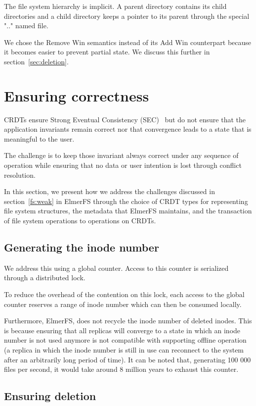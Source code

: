 \documentclass[sigconf, anonymous, 10pt]{acmart}
\begin{document}
The file system hierarchy is implicit. A parent directory contains its child
directories and a child directory keeps a pointer to its parent through
the special ".." named file.

We chose the Remove Win semantics instead of its Add Win counterpart because
it becomes easier to prevent partial state. We discuss this further
in section~\ref{sec:deletion}.

\section{Ensuring correctness}

CRDTs ensure Strong Eventual Consistency (SEC)~\cite{shapiro2011conflict} but
do not ensure that the application invariants remain correct
nor that convergence leads to a state that is meaningful
to the user.

The challenge is to keep those invariant always correct under any sequence
of operation while ensuring that no data or user intention is lost through
conflict resolution.

In this section,
we present how we address the challenges discussed in section~\ref{fs:weak}
in ElmerFS through the choice of CRDT types for representing file system structures,
the metadata that ElmerFS maintains, and the transaction of file system operations
to operations on CRDTs.

\subsection{Generating the inode number}
\label{sec:generation_inode_number}
We address this using a global counter. Access to this counter
is serialized through a distributed lock.

To reduce the overhead of the contention on this lock,
each access to the global counter reserves a range of inode number which
can then be consumed locally.

Furthermore, ElmerFS, does not recycle the inode number of deleted inodes.
This is because ensuring that all replicas will converge to a state in which
an inode number is not used anymore is not compatible with supporting offline
operation (a replica in which the inode number is still in use can reconnect
to the system after an arbitrarily long period of time).
It can be noted that, generating 100 000 files per second, it would take around
8 million years to exhaust this counter.

\subsection{Ensuring deletion}
\end{document}
